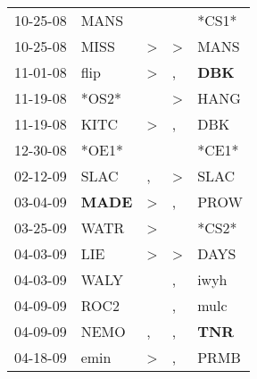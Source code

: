 \begin{supertabular}{p{0.07\textwidth}p{0.06\textwidth}p{0.02\textwidth}p{0.02\textwidth}p{0.06\textwidth}}
          10-25-08\textsuperscript{} &           MANS\textsuperscript{} &                  &                  &                            *CS1* \\
          10-25-08\textsuperscript{} &           MISS\textsuperscript{} &     \textgreater &     \textgreater &           MANS\textsuperscript{} \\
          11-01-08\textsuperscript{} &           flip\textsuperscript{} &     \textgreater &                , &   \textbf{DBK\textsuperscript{}} \\
          11-19-08\textsuperscript{} &                            *OS2* &                  &     \textgreater &           HANG\textsuperscript{} \\
          11-19-08\textsuperscript{} &           KITC\textsuperscript{} &     \textgreater &                , &            DBK\textsuperscript{} \\
          12-30-08\textsuperscript{} &                            *OE1* &                  &                  &                            *CE1* \\
          02-12-09\textsuperscript{} &           SLAC\textsuperscript{} &                , &     \textgreater &           SLAC\textsuperscript{} \\
          03-04-09\textsuperscript{} &  \textbf{MADE\textsuperscript{}} &     \textgreater &                , &           PROW\textsuperscript{} \\
          03-25-09\textsuperscript{} &           WATR\textsuperscript{} &     \textgreater &                  &                            *CS2* \\
          04-03-09\textsuperscript{} &            LIE\textsuperscript{} &     \textgreater &     \textgreater &           DAYS\textsuperscript{} \\
          04-03-09\textsuperscript{} &           WALY\textsuperscript{} &                  &                , &           iwyh\textsuperscript{} \\
          04-09-09\textsuperscript{} &           ROC2\textsuperscript{} &                  &                , &           mulc\textsuperscript{} \\
          04-09-09\textsuperscript{} &           NEMO\textsuperscript{} &                , &                , &   \textbf{TNR\textsuperscript{}} \\
          04-18-09\textsuperscript{} &           emin\textsuperscript{} &     \textgreater &                , &           PRMB\textsuperscript{} \\

\end{supertabular}
